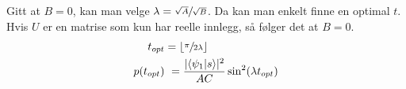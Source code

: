         Gitt at $B=0$, kan man velge $\lambda = \sfrac{\sqrt{A}}{\sqrt{B}}$. Da kan man enkelt finne en optimal $t$. Hvis $U$ er en matrise som kun har reelle innlegg, så følger det at $B=0$.
        \begin{align*}
            t_{opt} & = \lfloor \sfrac{\pi}{2\lambda} \rfloor \\
            p(t_{opt}) & = \frac{|\langle \psi_1|s\rangle|^2}{AC}\sin^2(\lambda t_{opt})
        \end{align*}